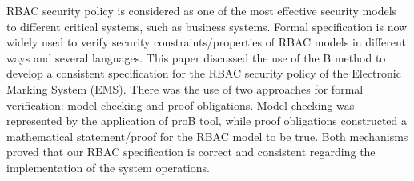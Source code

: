 RBAC security policy is considered as one of the most effective security models to different critical systems, such as business systems.  Formal specification is now widely used to verify security constraints/properties of RBAC models in different ways and several languages.  This paper discussed the use of the B method to develop a consistent specification for the RBAC security policy of the Electronic Marking System (EMS).   There was the use of two approaches for formal verification: model checking and proof obligations.  Model checking was represented by the application of proB tool, while proof obligations constructed a mathematical statement/proof for the RBAC model to be true.  Both mechanisms proved that our RBAC specification is correct and consistent regarding the implementation of the system operations.